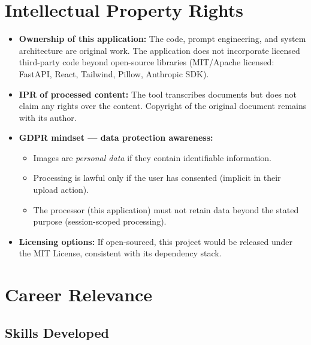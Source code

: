 \documentclass[12pt,a4paper]{article}
\begin{document}
\section{Intellectual Property Rights}

\begin{itemize}[noitemsep]
  \item \textbf{Ownership of this application:} The code, prompt engineering, and system
    architecture are original work. The application does not incorporate licensed third-party
    code beyond open-source libraries (MIT/Apache licensed: FastAPI, React, Tailwind, Pillow,
    Anthropic SDK).

  \item \textbf{IPR of processed content:} The tool transcribes documents but does not claim
    any rights over the content. Copyright of the original document remains with its author.

  \item \textbf{GDPR mindset — data protection awareness:}
    \begin{itemize}[noitemsep]
      \item Images are \emph{personal data} if they contain identifiable information.
      \item Processing is lawful only if the user has consented (implicit in their upload action).
      \item The processor (this application) must not retain data beyond the stated purpose
        (session-scoped processing).
    \end{itemize}

  \item \textbf{Licensing options:} If open-sourced, this project would be released under the
    MIT License, consistent with its dependency stack.
\end{itemize}


\section{Career Relevance}

\subsection{Skills Developed}
\end{document}
